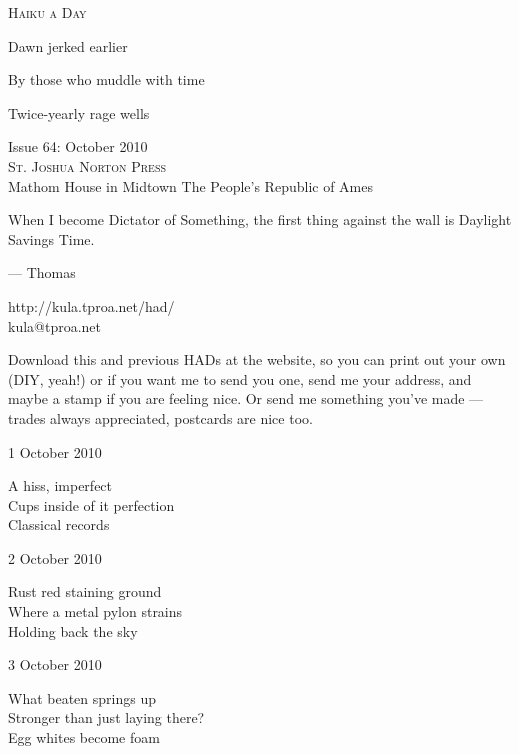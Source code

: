 \documentclass[12pt]{article}
\begin{document}
\begin{center}
{\fontsize{36}{48}\selectfont \textsc{Haiku a Day }}
\end{center}

\vspace*{3.5cm}

{\fontsize{20}{40}\selectfont 

Dawn jerked earlier

By those who muddle with time

Twice-yearly rage wells

}

\vspace*{5.0cm}
\begin{center}
{\large{Issue 64: October 2010}} \\[5mm]
{\fontsize{8}{8}\selectfont  \textsc{ St. Joshua Norton Press }} \\[1mm]
{\fontsize{6}{6}\selectfont Mathom House in Midtown \textbar The People's Republic of Ames }
\end{center}


\newpage

When I become Dictator of Something, the first thing against the
wall is Daylight Savings Time.

--- Thomas

http://kula.tproa.net/had/ \\
kula@tproa.net

Download this and previous HADs at the website, so you can
print out your own (DIY, yeah!) or if you want me to send
you one, send me your address, and maybe a stamp if you
are feeling nice. Or send me something you've made ---
trades always appreciated, postcards are nice too.

\vspace*{2.5cm}

1 October 2010

A hiss, imperfect \\
Cups inside of it perfection \\
Classical records

2 October 2010

Rust red staining ground \\
Where a metal pylon strains \\
Holding back the sky

3 October 2010

What beaten springs up \\
Stronger than just laying there? \\
Egg whites become foam
\end{document}

